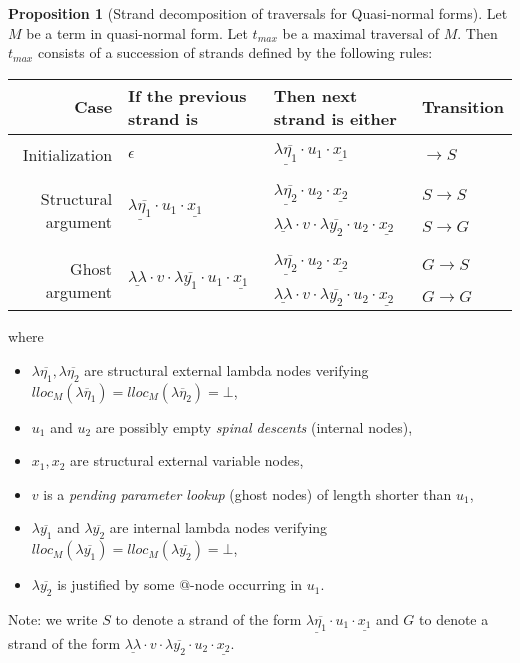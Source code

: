 \documentclass{article}
\theoremstyle{definition}
\newtheorem{proposition}{Proposition}[section]
\newcommand{\ghostlmd}{{\lambda\!\!\lambda}}
\begin{document}
\begin{proposition}[Strand decomposition of traversals for Quasi-normal forms]
\label{prop:qnf_strand_decomposition}
Let $M$ be a term in quasi-normal form. Let $t_{max}$ be a maximal traversal of $M$. Then $t_{max}$ consists of a succession of strands defined by the following rules:
\begin{center}
\begin{tabular}{rlll}
Case & If the previous strand is & Then next strand is either & Transition \\
\hline \hline \\
Initialization & $\epsilon$ & $\underline{\lambda\overline{\eta_1}} \cdot u_1 \cdot \underline{x_1}$ & $\rightarrow S$\\ \\
\hline \\
\multirow{3}{*}{Structural argument} & \multirow{3}{*}{$\underline{\lambda\overline{\eta_1}} \cdot u_1 \cdot \underline{x_1} $}
 & $\underline{\lambda\overline{\eta_2}} \cdot u_2 \cdot \underline{x_2}$ & $S \rightarrow S$ \\ \\
 & & $\underline{\ghostlmd} \cdot  v \cdot \lambda\overline{y_2} \cdot u_2 \cdot \underline{x_2}$ & $S \rightarrow G$ \\ \\
\hline \\
\multirow{3}{*}{Ghost argument} & \multirow{3}{*}{$\underline{\ghostlmd} \cdot  v \cdot \lambda\overline{y_1} \cdot u_1 \cdot \underline{x_1}$}
& $\underline{\lambda\overline{\eta_2}} \cdot u_2 \cdot \underline{x_2}$ & $G \rightarrow S$
\\ \\
  & & $\underline{\ghostlmd} \cdot v \cdot \lambda\overline{y_2} \cdot u_2 \cdot \underline{x_2}$ & $G \rightarrow G$
\end{tabular}
\end{center}
where
    \begin{itemize}
    \item $\lambda\overline{\eta_1}, \lambda\overline{\eta_2}$ are structural external lambda nodes verifying $lloc_M(\lambda\overline\eta_1) = lloc_M(\lambda\overline\eta_2) = \bot$,
    \item $u_1$ and $u_2$ are possibly empty \emph{spinal descents} (internal nodes),
    \item $x_1,x_2$ are structural external variable nodes,
    \item $v$ is a \emph{pending parameter lookup} (ghost nodes) of length shorter than $u_1$,
    \item $\lambda\overline{y_1}$ and $\lambda\overline{y_2}$ are internal lambda nodes verifying $lloc_M(\lambda\overline{y_1}) = lloc_M(\lambda\overline{y_2}) = \bot$,
    \item $\lambda\overline{y_2}$ is justified by some $@$-node occurring in $u_1$.
    \end{itemize}
Note: we write $S$ to denote a strand of the form $\underline{\lambda\overline{\eta_1}} \cdot u_1 \cdot \underline{x_1}$
and $G$ to denote a strand of the form $\underline{\ghostlmd} \cdot  v \cdot \lambda\overline{y_2} \cdot u_2 \cdot \underline{x_2}$.
\end{proposition}
\end{document}
